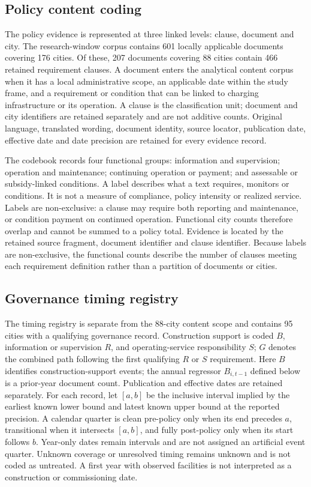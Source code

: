 \subsection{Policy content coding}
\label{sec:si-policy-methods}

The policy evidence is represented at three linked levels: clause, document
and city.  The research-window corpus contains 601 locally applicable
documents covering 176 cities.  Of these, 207 documents covering 88 cities
contain 466 retained requirement clauses.  A document enters the analytical
content corpus when it has a local administrative scope, an applicable date
within the study frame, and a requirement or condition that can be linked to
charging infrastructure or its operation.  A clause is the classification
unit; document and city identifiers are retained separately and are not
additive counts.  Original language, translated wording, document identity,
source locator, publication date, effective date and date precision are
retained for every evidence record.

The codebook records four functional groups: information and supervision;
operation and maintenance; continuing operation or payment; and assessable or
subsidy-linked conditions.  A label describes what a text requires, monitors
or conditions.  It is not a measure of compliance, policy intensity or realized
service.  Labels are non-exclusive: a clause may require both reporting and
maintenance, or condition payment on continued operation.  Functional city
counts therefore overlap and cannot be summed to a policy total.  Evidence is
located by the retained source fragment, document identifier and
clause identifier.  Because labels are non-exclusive, the functional counts
describe the number of clauses meeting each requirement definition rather than
a partition of documents or cities.

\subsection{Governance timing registry}
The timing registry is separate from the 88-city content scope and contains 95
cities with a qualifying governance record.  Construction support is coded
$B$, information or supervision $R$, and operating-service responsibility
$S$; $G$ denotes the combined path following the first qualifying $R$ or $S$
requirement.  Here $B$ identifies construction-support events; the annual
regressor $B_{i,t-1}$ defined below is a prior-year document count.
Publication and effective dates are retained separately.  For
each record, let $[a,b]$ be the inclusive interval implied by the earliest known
lower bound and latest known upper bound at the reported precision.  A calendar
quarter is clean pre-policy only when its end precedes $a$, transitional when it
intersects $[a,b]$, and fully post-policy only when its start follows $b$.
Year-only dates remain intervals and are not assigned an artificial event
quarter.  Unknown coverage or unresolved timing remains unknown and is not
coded as untreated.  A first year with observed facilities is not interpreted
as a construction or commissioning date.

